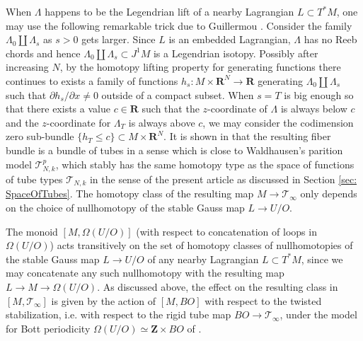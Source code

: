 \documentclass{amsart}
\newcommand\cN{\mathcal{N}}
\newcommand\cT{\mathcal{T}}
\def\bC{\mathbf{C}}
\def\bR{\mathbf{R}}
\def\bZ{\mathbf{Z}}
\theoremstyle{definition}
\theoremstyle{remark}
\newtheorem{inductive lemma}[theorem]{Inductive Lemma}
\begin{document}
When $\Lambda$ happens to be the Legendrian lift of a nearby Lagrangian $L \subset T^*M$, one may use the following remarkable trick due to Guillermou \cite{Gui12}. Consider the family $\Lambda_0 \coprod \Lambda_s$ as $s>0$ gets larger. Since $L$ is an embedded Lagrangian, $\Lambda$ has no Reeb chords and hence $\Lambda_0 \coprod \Lambda_s \subset J^1M$ is a Legendrian isotopy. Possibly after increasing $N$, by the homotopy lifting property for generating functions there continues to exists a family of functions $h_s:M \times \bR^N \to \bR$ generating  $\Lambda_0 \coprod \Lambda_s$ such that $\partial h_s / \partial x \neq 0$ outside of a compact subset. When $s=T$ is big enough so that there exists a value $c \in \bR$ such that the $z$-coordinate of $\Lambda$ is always below $c$ and the $z$-coordinate for $\Lambda_T$ is always above $c$, we may consider the codimension zero sub-bundle $\{h_T \leq c \} \subset M \times \bR^N$. It is shown in \cite{ACGK} that the resulting fiber bundle is a bundle of tubes in a sense which is close to Waldhausen's parition model $\cT_{N,k}^p$, which stably has the same homotopy type as the space of functions of tube types $\cT_{N,k}$ in the sense of the present article as discussed in Section \ref{sec: SpaceOfTubes}. The homotopy class of the resulting map $M \to \cT_\infty$ only depends on the choice of nullhomotopy of the stable Gauss map $L \to U/O$.


The monoid $[M,\Omega(U/O)]$ (with respect to concatenation of loops in $\Omega(U/O)$) acts transitively on the set of homotopy classes of nullhomotopies of the stable Gauss map $L \to U/O$ of any nearby Lagrangian $L \subset T^*M$, since we may concatenate any such nullhomotopy with the resulting map $L \to M \to \Omega (U/O)$. As discussed above, the effect on the resulting class in $[M, \cT_\infty]$ is given by the action of $[M, BO]$ with respect to the twisted stabilization, i.e. with respect to the rigid tube map $BO \to \cT_\infty$, under the model for Bott periodicity $\Omega(U/O) \simeq \bZ \times BO$ of \cite{G90}.  
\end{document}
